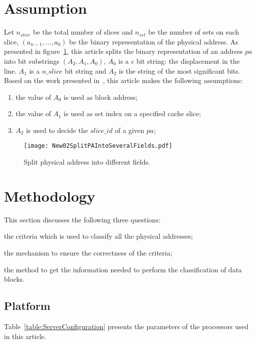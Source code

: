 \documentclass[conference]{IEEEtran}
\newcommand{\SliceID}{slice\_id }
\newcommand{\PhysicalAddressAbbreviation}{pa}
\newcommand{\MA}{\PhysicalAddressAbbreviation}
\newcommand{\PhysicalAddressWidth}{n}
\newcommand{\NUMSLICE}{n_{slice}}
\newcommand{\NUMSET}{n_{set}}
\newcommand{\WIDTHSetIndex}{$n\_slice$}
\begin{document}
\section{Assumption}
Let $\NUMSLICE$ be the total number of slices and $\NUMSET$ be the number of sets on each slice, 
$\left(a_{\PhysicalAddressWidth-1},\dots,a_0\right)$ be the binary representation of the physical address. 
As presented in figure~\ref{fig:SplitPhysicalAddress}, this article splits the binary representation of an address $\MA$ into bit substrings $\left(A_2, A_1, A_0\right)$, $A_0$ is a $c$ bit string: the displacement in the line. 
$A_1$ is a \WIDTHSetIndex{} bit string and $A_2$ is the string of the most significant bits. 
Based on the work presented in~\cite{sandybridgehash}, this article makes the following assumptions:
\begin{enumerate}
\item the value of $A_0$ is used as block address;
\item the value of $A_1$ is used as set index on a specified cache slice;\item $A_2$ is used to decide the $\SliceID$ of a given $\MA$;
\end{enumerate}
\begin{figure}[!htbp]
\centering
\texttt{[image: New02SplitPAIntoSeveralFields.pdf]}
\caption{Split physical address into different fields.}
\label{fig:SplitPhysicalAddress}
\end{figure}
\section{Methodology}
This section discusses the following three questions: 
\begin{inparaenum}[(1)]
\item the criteria which is used to classify all the physical addresses;
\item the mechanism to ensure the correctness of the criteria;
\item the method to get the information needed to perform the classification of data blocks. 
\end{inparaenum}
\subsection{Platform}
Table~\ref{table:ServerConfiguration} presents the parameters of the processors used in this article.
\end{document}
